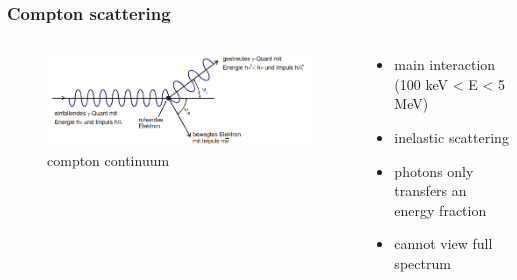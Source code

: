 \documentclass[aspectratio=1610, 12pt]{beamer}
\begin{document}
\begin{frame}\frametitle{Compton scattering}
  \begin{columns}
    \begin{column}[c]{0.48\textwidth}
      \begin{figure}
        \includegraphics[width=\textwidth]{plots/compton.png}
        \caption{compton continuum}
      \end{figure}
    \end{column}
    \begin{column}[c]{0.48\textwidth}
      \begin{itemize}
        \item main interaction (100 keV < E < 5 MeV)
        \item inelastic scattering
        \item photons only transfers an energy fraction
        \item cannot view full spectrum \frownie{}
      \end{itemize}
    \end{column}
  \end{columns}
\end{frame}
\end{document}
